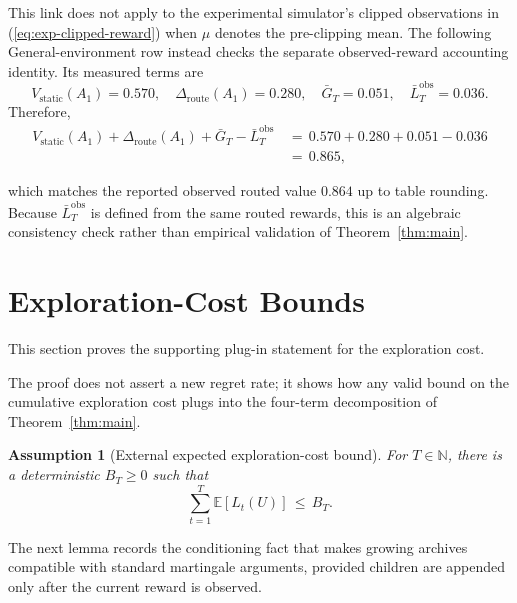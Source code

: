 \documentclass{article} %
\newtheorem{assumption}{Assumption}
\renewcommand{\eqref}[1]{\textup{(\ref{#1})}}
\begin{document}
This link does not apply to the experimental simulator's clipped observations in
\eqref{eq:exp-clipped-reward} when \(\mu\) denotes the pre-clipping mean.
The following General-environment row instead checks the separate observed-reward
accounting identity.  Its measured terms are
\begin{equation}
V_{\mathrm{static}}(A_1)=0.570,\quad
\Delta_{\mathrm{route}}(A_1)=0.280,\quad
\bar G_T=0.051,\quad
\bar L_T^{\mathrm{obs}}=0.036.
\end{equation}
Therefore,
\begin{equation}
\label{eq:app-numeric-closure}
\begin{aligned}
V_{\mathrm{static}}(A_1)
+
\Delta_{\mathrm{route}}(A_1)
+
\bar G_T
-
\bar L_T^{\mathrm{obs}}
&\,=\,
0.570+0.280+0.051-0.036
\\
&\,=\,
0.865,
\end{aligned}
\end{equation}

which matches the reported observed routed value \(0.864\) up to table
rounding. Because \(\bar L_T^{\mathrm{obs}}\) is defined from the same routed
rewards, this is an algebraic consistency check rather than empirical
validation of Theorem~\ref{thm:main}.

\section{Exploration-Cost Bounds}

\label{app:proofs2}

This section proves the supporting plug-in statement for the exploration
cost.

The proof does not assert a new regret rate; it shows how any valid bound on the cumulative exploration cost plugs into the four-term decomposition of Theorem~\ref{thm:main}.

\begin{assumption}[External expected exploration-cost bound]
\label{ass:app-external-tax}
For \(T\in\mathbb N\), there is a deterministic \(B_T\geq0\) such that
\begin{equation}
\label{eq:app-external-tax-assumption}
\sum_{t=1}^{T}\mathbb{E}[L_t(U)]
\,\leq\,
B_T.
\end{equation}
\end{assumption}

The next lemma records the conditioning fact that makes growing archives compatible with standard martingale arguments, provided children are appended only after the current reward is observed.
\end{document}
